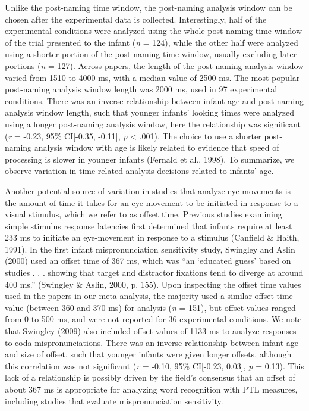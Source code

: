 \documentclass[man]{apa6}
\theoremstyle{definition}
\theoremstyle{definition}
\theoremstyle{definition}
\theoremstyle{remark}
\begin{document}
Unlike the post-naming time window, the post-naming analysis window can
be chosen after the experimental data is collected. Interestingly, half
of the experimental conditions were analyzed using the whole post-naming
time window of the trial presented to the infant (\emph{n} = 124), while
the other half were analyzed using a shorter portion of the post-naming
time window, usually excluding later portions (\emph{n} = 127). Across
papers, the length of the post-naming analysis window varied from 1510
to 4000 ms, with a median value of 2500 ms. The most popular post-naming
analysis window length was 2000 ms, used in 97 experimental conditions.
There was an inverse relationship between infant age and post-naming
analysis window length, such that younger infants' looking times were
analyzed using a longer post-naming analysis window, here the
relationship was significant (\emph{r} = -0.23, 95\% CI{[}-0.35,
-0.11{]}, \emph{p} \textless{} .001). The choice to use a shorter
post-naming analysis window with age is likely related to evidence that
speed of processing is slower in younger infants (Fernald et al., 1998).
To summarize, we observe variation in time-related analysis decisions
related to infants' age.

Another potential source of variation in studies that analyze
eye-movements is the amount of time it takes for an eye movement to be
initiated in response to a visual stimulus, which we refer to as offset
time. Previous studies examining simple stimulus response latencies
first determined that infants require at least 233 ms to initiate an
eye-movement in response to a stimulus (Canfield \& Haith, 1991). In the
first infant mispronunciation sensitivity study, Swingley and Aslin
(2000) used an offset time of 367 ms, which was \enquote{an
\enquote{educated guess} based on studies . . . showing that target and
distractor fixations tend to diverge at around 400 ms.} (Swingley \&
Aslin, 2000, p. 155). Upon inspecting the offset time values used in the
papers in our meta-analysis, the majority used a similar offset time
value (between 360 and 370 ms) for analysis (\emph{n} = 151), but offset
values ranged from 0 to 500 ms, and were not reported for 36
experimental conditions. We note that Swingley (2009) also included
offset values of 1133 ms to analyze responses to coda mispronunciations.
There was an inverse relationship between infant age and size of offset,
such that younger infants were given longer offsets, although this
correlation was not significant (\emph{r} = -0.10, 95\% CI{[}-0.23,
0.03{]}, \emph{p} = 0.13). This lack of a relationship is possibly
driven by the field's consensus that an offset of about 367 ms is
appropriate for analyzing word recognition with PTL measures, including
studies that evaluate mispronunciation sensitivity.
\end{document}
